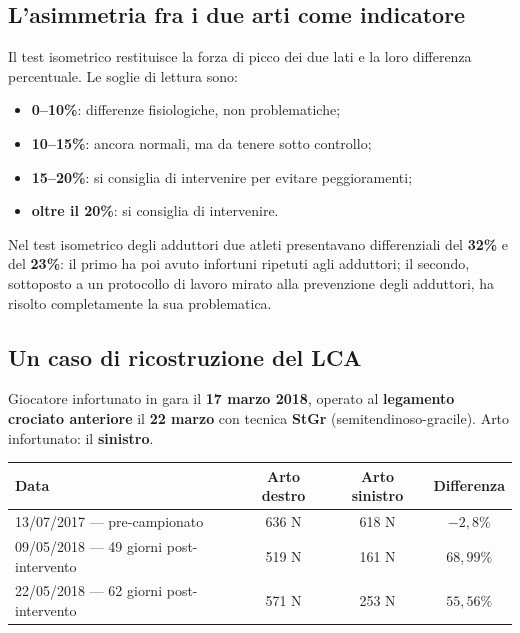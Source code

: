 \subsection{L'asimmetria fra i due arti come indicatore}

Il test isometrico restituisce la forza di picco dei due lati e la loro differenza percentuale. Le
soglie di lettura sono:

\begin{itemize}
  \item \textbf{0--10\%}: differenze fisiologiche, non problematiche;
  \item \textbf{10--15\%}: ancora normali, ma da tenere sotto controllo;
  \item \textbf{15--20\%}: si consiglia di intervenire per evitare peggioramenti;
  \item \textbf{oltre il 20\%}: si consiglia di intervenire.
\end{itemize}

Nel test isometrico degli adduttori due atleti presentavano differenziali del \textbf{32\%} e del
\textbf{23\%}: il primo ha poi avuto infortuni ripetuti agli adduttori; il secondo, sottoposto a un
protocollo di lavoro mirato alla prevenzione degli adduttori, ha risolto completamente la sua
problematica.

\subsection{Un caso di ricostruzione del LCA}

Giocatore infortunato in gara il \textbf{17 marzo 2018}, operato al \textbf{legamento crociato
anteriore} il \textbf{22 marzo} con tecnica \textbf{StGr} (semitendinoso-gracile). Arto infortunato:
il \textbf{sinistro}.


\begin{table}[htbp]
  \centering
  \small
  \renewcommand{\arraystretch}{1.3}
  \begin{tabularx}{\textwidth}{|X|c|c|c|}
    \hline
    \textbf{Data} & \textbf{Arto destro} & \textbf{Arto sinistro} & \textbf{Differenza} \\
    \hline
    13/07/2017 --- pre-campionato & 636 N & 618 N & $-2,8\%$ \\
    \hline
    09/05/2018 --- 49 giorni post-intervento & 519 N & 161 N & $68,99\%$ \\
    \hline
    22/05/2018 --- 62 giorni post-intervento & 571 N & 253 N & $55,56\%$ \\
    \hline
  \end{tabularx}
\end{table}

